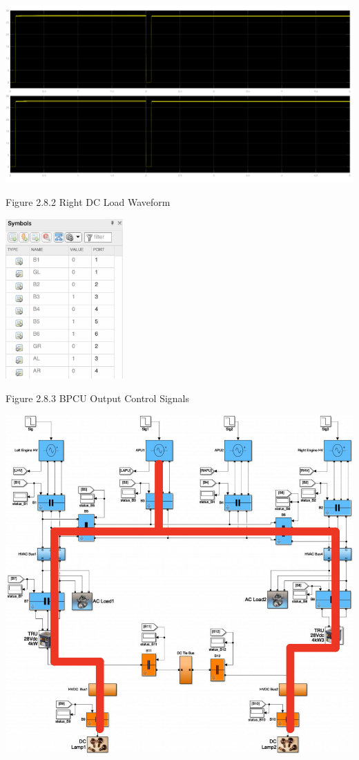 \documentclass{mcmthesis}
\begin{document}
\includegraphics[trim= 0 0.255\imageheight{} 0 0, clip, width = 0.185\imageheight{}]{gl_gr_ar_load2.png}
\begin{center}
\small{Figure 2.8.2 Right DC Load Waveform}
\end{center}
\begin{center}
\includegraphics[width=4.5cm]{gl_gr_ar_signals.png}
\end{center}
\begin{center}
\small{Figure 2.8.3 BPCU Output Control Signals}
\end{center}
\begin{center}
\includegraphics[width=14.5cm]{gl_gr_ar.png}
\end{center}
\end{document}
